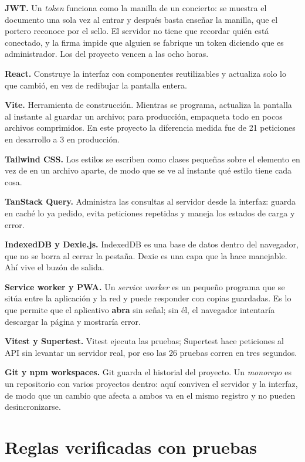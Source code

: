 \textbf{JWT.} Un \emph{token} funciona como la manilla de un concierto: se muestra
el documento una sola vez al entrar y después basta enseñar la manilla, que el
portero reconoce por el sello. El servidor no tiene que recordar quién está
conectado, y la firma impide que alguien se fabrique un token diciendo que es
administrador. Los del proyecto vencen a las ocho horas.

\textbf{React.} Construye la interfaz con componentes reutilizables y actualiza
solo lo que cambió, en vez de redibujar la pantalla entera.

\textbf{Vite.} Herramienta de construcción. Mientras se programa, actualiza la
pantalla al instante al guardar un archivo; para producción, empaqueta todo en
pocos archivos comprimidos. En este proyecto la diferencia medida fue de 21
peticiones en desarrollo a 3 en producción.

\textbf{Tailwind CSS.} Los estilos se escriben como clases pequeñas sobre el
elemento en vez de en un archivo aparte, de modo que se ve al instante qué estilo
tiene cada cosa.

\textbf{TanStack Query.} Administra las consultas al servidor desde la interfaz:
guarda en caché lo ya pedido, evita peticiones repetidas y maneja los estados de
carga y error.

\textbf{IndexedDB y Dexie.js.} IndexedDB es una base de datos dentro del
navegador, que no se borra al cerrar la pestaña. Dexie es una capa que la hace
manejable. Ahí vive el buzón de salida.

\textbf{Service worker y PWA.} Un \emph{service worker} es un pequeño programa que
se sitúa entre la aplicación y la red y puede responder con copias guardadas. Es
lo que permite que el aplicativo \textbf{abra} sin señal; sin él, el navegador
intentaría descargar la página y mostraría error.

\textbf{Vitest y Supertest.} Vitest ejecuta las pruebas; Supertest hace peticiones
al API sin levantar un servidor real, por eso las 26 pruebas corren en tres
segundos.

\textbf{Git y npm workspaces.} Git guarda el historial del proyecto. Un
\emph{monorepo} es un repositorio con varios proyectos dentro: aquí conviven el
servidor y la interfaz, de modo que un cambio que afecta a ambos va en el mismo
registro y no pueden desincronizarse.

\section{Reglas verificadas con pruebas}

